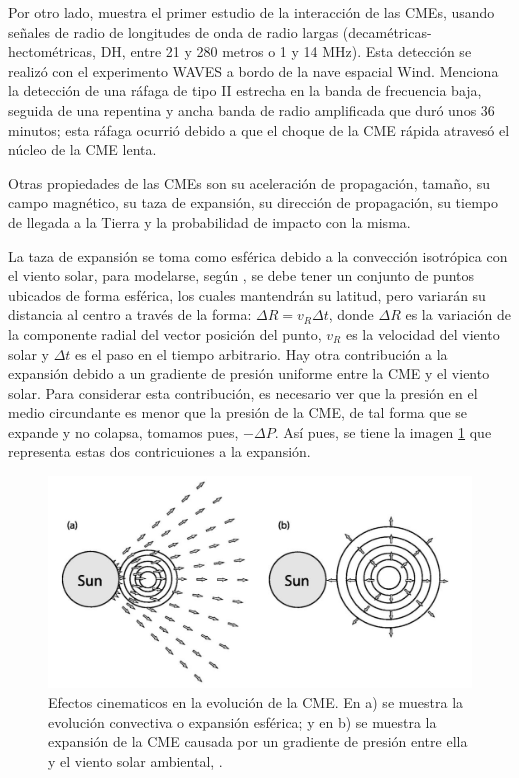 Por otro lado, \cite{gopalswamy-2001} muestra el primer estudio de la interacción de las CMEs, usando señales de radio de longitudes de onda de radio largas (decamétricas-hectométricas, DH, entre 21 y 280 metros o 1 y 14 MHz). Esta detección se realizó con el experimento WAVES a bordo de la nave espacial Wind. Menciona la detección de una ráfaga de tipo II estrecha en la banda de frecuencia baja, seguida de una repentina y ancha banda de radio amplificada que duró unos 36 minutos; esta ráfaga ocurrió debido a que el choque de la \ac{CME} rápida atravesó el núcleo de la \ac{CME} lenta. 



Otras propiedades de las \acp{CME} son su aceleración de propagación, tamaño, su campo magnético, su taza de expansión, su dirección de propagación, su tiempo de llegada a la Tierra y la probabilidad de impacto con la misma.


La taza de expansión se toma como esférica debido a la convección isotrópica con el viento solar, para modelarse, según \cite{riley-2004}, se debe tener un conjunto de puntos ubicados de forma esférica, los cuales mantendrán su latitud, pero variarán su distancia al centro a través de la forma: $\Delta R=v_{R}\Delta t$, donde $\Delta R$ es la variación de la componente radial del vector posición del punto, $v_R$ es la velocidad del viento solar y $\Delta t$ es el paso en el tiempo arbitrario. Hay otra contribución a la expansión debido a un gradiente de presión uniforme entre la \ac{CME} y el viento solar. Para considerar esta contribución, es necesario ver que la presión en el medio circundante es menor que la presión de la CME, de tal forma que se expande y no colapsa, tomamos pues, $-\Delta P$. Así pues, se tiene la imagen \ref{fig:expansión} que representa estas dos contricuiones a la expansión.

\begin{figure}[H]
\centering
    \includegraphics[width=0.9\linewidth]{imag/expansión.png}
    \caption[Evolución morfológica de la CME debida a efectos convectivos y gradientes de presión]{Efectos cinematicos en la evolución de la CME. En a) se muestra la evolución convectiva o expansión esférica; y en b) se muestra la expansión de la \ac{CME} causada por un gradiente de presión entre ella y el viento solar ambiental, \cite{riley-2004}.}
    \label{fig:expansión}
\end{figure}

